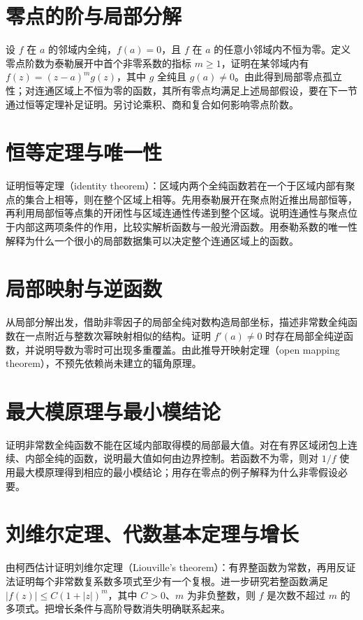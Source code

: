 \documentclass[UTF8,12pt,a4paper,fontset=fandol]{ctexbook}
\begin{document}
\section{零点的阶与局部分解}
设 $f$ 在 $a$ 的邻域内全纯，$f(a)=0$，且 $f$ 在 $a$ 的任意小邻域内不恒为零。定义零点阶数为泰勒展开中首个非零系数的指标 $m\ge1$，证明在某邻域内有 $f(z)=(z-a)^m g(z)$，其中 $g$ 全纯且 $g(a)\ne0$。由此得到局部零点孤立性；对连通区域上不恒为零的函数，其所有零点均满足上述局部假设，要在下一节通过恒等定理补足证明。另讨论乘积、商和复合如何影响零点阶数。

\section{恒等定理与唯一性}
证明恒等定理（identity theorem）：区域内两个全纯函数若在一个于区域内部有聚点的集合上相等，则在整个区域上相等。先用泰勒展开在聚点附近推出局部恒等，再利用局部恒等点集的开闭性与区域连通性传递到整个区域。说明连通性与聚点位于内部这两项条件的作用，比较实解析函数与一般光滑函数。用泰勒系数的唯一性解释为什么一个很小的局部数据集可以决定整个连通区域上的函数。

\section{局部映射与逆函数}
从局部分解出发，借助非零因子的局部全纯对数构造局部坐标，描述非常数全纯函数在一点附近与整数次幂映射相似的结构。证明 $f'(a)\ne0$ 时存在局部全纯逆函数，并说明导数为零时可出现多重覆盖。由此推导开映射定理（open mapping theorem），不预先依赖尚未建立的辐角原理。

\section{最大模原理与最小模结论}
证明非常数全纯函数不能在区域内部取得模的局部最大值。对在有界区域闭包上连续、内部全纯的函数，说明最大值如何由边界控制。若函数不为零，则对 $1/f$ 使用最大模原理得到相应的最小模结论；用存在零点的例子解释为什么非零假设必要。

\section{刘维尔定理、代数基本定理与增长}
由柯西估计证明刘维尔定理（Liouville's theorem）：有界整函数为常数，再用反证法证明每个非常数复系数多项式至少有一个复根。进一步研究若整函数满足 $|f(z)|\le C(1+|z|)^m$，其中 $C>0$、$m$ 为非负整数，则 $f$ 是次数不超过 $m$ 的多项式。把增长条件与高阶导数消失明确联系起来。
\end{document}
